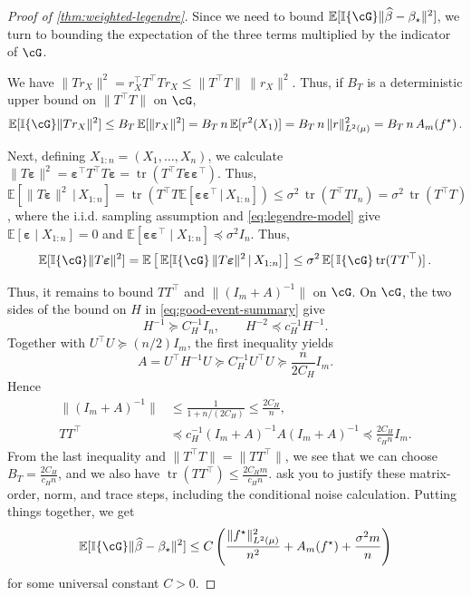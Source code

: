 \documentclass[11pt,twoside]{article}
\DeclareMathOperator{\trace}{tr}
\newcommand{\E}{\mathbb E}
\newcommand{\I}{\mathbb I}
\newcommand{\one}[1]{\I\{#1\}}
\theoremstyle{definition}
\theoremstyle{remark}
\begin{document}
\begin{proof}[Proof of \cref{thm:weighted-legendre}]
Since we need to bound $\E[ \one{\cG}\|\widehat\beta-\beta_\star\|^2 ]$,
we turn to bounding the expectation of the three terms multiplied by the indicator of $\cG$.

We have $\|T r_X \|^2 =  r_X^\top T^\top T r_X \le \|T^\top T\|\, \|r_X \|^2$.
Thus, if $B_T$ is a deterministic upper bound on $\|T^\top T\|$ on $\cG$,
\[
\E[ \one{\cG} \|T r_X \|^2] \le B_T \,\E[ \|r_X\|^2]=B_T \,n\, \E[r^2(X_1)]
= B_T \,n\, \|r\|_{L^2(\mu)}^2
 =B_T\,n\,A_m(f^\star)\,.
\]

 \newcommand{\beps}{\boldsymbol\varepsilon}
 Next, defining $X_{1:n} = (X_1,\dots,X_n)$,
 we calculate $\| T \boldsymbol\varepsilon\|^2 =  \beps^\top T^\top T \beps = \trace(
   T^\top T \beps \beps^\top )$.
Thus, $\E[ \| T \boldsymbol\varepsilon\|^2\, | \,X_{1:n}] = \trace(T^\top T \E[\beps \beps^\top\,|\,X_{1:n} ]  )
\le \sigma^2 \,\trace(T^\top T I_n)
=\sigma^2\, \trace(T^\top T)
$, where the i.i.d. sampling assumption and \cref{eq:legendre-model} give
$\E[\beps\mid X_{1:n}]=0$ and
$\E[\beps\beps^\top\mid X_{1:n}]\preceq\sigma^2 I_n$.
Thus, 
\begin{align*}
 \E[ \one{\cG} \| T \boldsymbol\varepsilon\|^2 ]
 = 
\E\left[\,\E[ \one{\cG}\, \| T \boldsymbol\varepsilon\|^2 \,|\, X_{1:n} ]\,\right]
 \le
 \sigma^2\, \E[ \, \one{\cG} \trace(T T^\top) ]\,.
\end{align*}

Thus, it remains to bound $T T^\top$ and 
 $\|(I_m+A)^{-1}\|$ on $\cG$.
On $\cG$, the two sides of the bound on $H$ in
\cref{eq:good-event-summary} give
\[
 H^{-1}\succeq C_H^{-1}I_n,
 \qquad H^{-2}\preceq c_H^{-1}H^{-1}.
\]
Together with $U^\top U\succeq(n/2)I_m$, the first inequality yields
\[
 A=U^\top H^{-1}U\succeq C_H^{-1}U^\top U
 \succeq\frac{n}{2C_H}I_m.
\]
Hence
\begin{equation}
\begin{split}  
 \|(I_m+A)^{-1}\|
 &\le \frac{1}{1+n/(2C_H)}\le\frac{2C_H}{n},\\
 TT^\top
 &\preceq c_H^{-1}(I_m+A)^{-1}A(I_m+A)^{-1}
 \preceq\frac{2C_H}{c_Hn}I_m.
\end{split}
 \label{eq:T-bounds}
\end{equation}
From the last inequality and $\|T^\top T\|=\|TT^\top\|$, we see that we can choose
$B_T = \frac{2C_H}{c_Hn}$,
and we also have $\trace(T T^\top)\le \frac{2C_H m}{c_Hn}$.
 ask you to justify these
matrix-order, norm, and trace steps, including the conditional noise calculation.
Putting things together, we get 
\begin{equation}
 \E[\I\{\cG\}\|\widehat\beta-\beta_\star\|^2]
 \le C\left(\frac{\|f^\star\|_{L^2(\mu)}^2}{n^2}
            +A_m(f^\star)+\frac{\sigma^2m}{n}\right)
 \label{eq:head-risk}
\end{equation}
for some universal constant $C>0$.


\end{proof}
\end{document}
